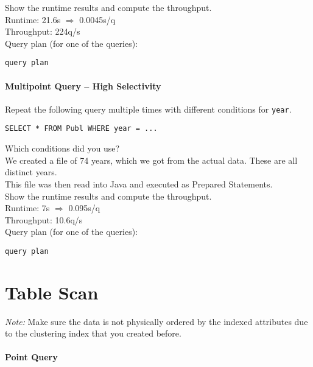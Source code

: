 \documentclass[11pt]{scrartcl}
\begin{document}
\smallskip\noindent
Show the runtime results and compute the throughput.\\
Runtime: 21.6s $\Rightarrow$ 0.0045s/q\\
Throughput: 224q/s\\

\smallskip\noindent
Query plan (for one of the queries):
{\small
\begin{verbatim}
query plan
\end{verbatim}
}


\paragraph{Multipoint Query -- High Selectivity}

Repeat the following query multiple times with different conditions for {\tt year}.

{\small
\begin{verbatim}
SELECT * FROM Publ WHERE year = ...
\end{verbatim}
}

\noindent
Which conditions did you use?\\
We created a file of 74 years, which we got from the actual data. These are all distinct years.\\
This file was then read into Java and executed as Prepared Statements.\\

\smallskip\noindent
Show the runtime results and compute the throughput.\\
Runtime: 7s $\Rightarrow$ 0.095s/q\\
Throughput: 10.6q/s\\

\smallskip\noindent
Query plan (for one of the queries):
{\small
\begin{verbatim}
query plan
\end{verbatim}
}


\section{Table Scan}

\noindent \emph{Note:} Make sure the data is not physically ordered by
the indexed attributes due to the clustering index that you created
before.

\paragraph{Point Query}
\end{document}
